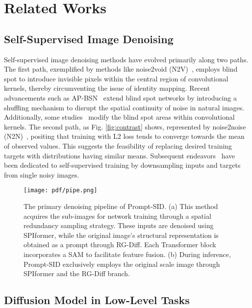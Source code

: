 \section{Related Works}
\subsection{Self-Supervised Image Denoising}
Self-supervised image denoising methods have evolved primarily along two paths. The first path, exemplified by methods like noise2void (N2V)~\cite{krull2019noise2void}, employs blind spot to introduce invisible pixels within the central region of convolutional kernels, thereby circumventing the issue of identity mapping. Recent advancements such as AP-BSN~\cite{lee2022ap} extend blind spot networks by introducing a shuffling mechanism to disrupt the spatial continuity of noise in natural images. Additionally, some studies~\cite{wang2023lg} modify the blind spot areas within convolutional kernels. The second path, as Fig. \ref{fig:contrast} shows, 
represented by noise2noise (N2N)~\cite{lehtinen2018noise2noise}, positing that training with L2 loss tends to converge towards the mean of observed values. This suggests the feasibility of replacing desired training targets with distributions having similar means. Subsequent endeavors~\cite{huang2021neighbor2neighbor,mansour2023zero,li2023spatial} have been dedicated to self-supervised training by downsampling inputs and targets from single noisy images. 
\begin{figure*}[h]
  \centering
  \texttt{[image: pdf/pipe.png]}
  \caption{The primary denoising pipeline of Prompt-SID. (a) This method acquires the sub-images for network training through a spatial redundancy sampling strategy. These inputs are denoised using SPIformer, while the original image's structural representation is obtained as a prompt through RG-Diff. Each Transformer block incorporates a SAM to facilitate feature fusion. (b) During inference, Prompt-SID exclusively employs the original scale image through SPIformer and the RG-Diff branch.}
  \label{fig:pipe}
\end{figure*}
\subsection{Diffusion Model in Low-Level Tasks}

